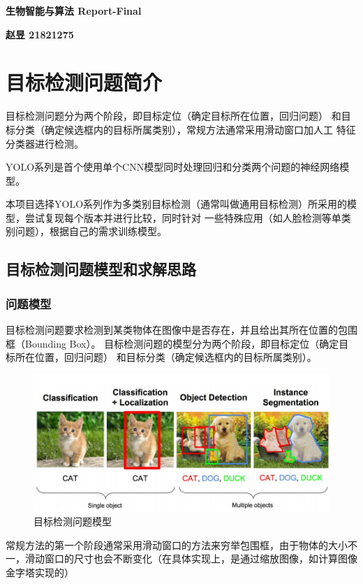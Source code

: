 \documentclass[a4paper, notitlepage]{article}
\begin{document}
\setlength{\parindent}{0pt}
\begin{center}
	\LARGE\textbf{生物智能与算法 Report-Final}
\end{center}
\vspace{1em}

\begin{center}
	\textbf{赵昱 21821275}
\end{center}

\setlength{\parindent}{2em}

\section{目标检测问题简介}
目标检测问题分为两个阶段，即目标定位（确定目标所在位置，回归问题）
和目标分类（确定候选框内的目标所属类别），常规方法通常采用滑动窗口加人工
特征分类器进行检测。

YOLO系列\cite{1,2,3}是首个使用单个CNN模型同时处理回归和分类两个问题的神经网络模型。

本项目选择YOLO系列作为多类别目标检测（通常叫做通用目标检测）所采用的模型，尝试复现每个版本并进行比较，同时针对
一些特殊应用（如人脸检测等单类别问题），根据自己的需求训练模型。

\subsection{目标检测问题模型和求解思路}
\subsubsection{问题模型}
目标检测问题要求检测到某类物体在图像中是否存在，并且给出其所在位置的包围框（Bounding Box）。
目标检测问题的模型分为两个阶段，即目标定位（确定目标所在位置，回归问题） 和目标分类（确定候选框内的目标所属类别）。
\begin{figure}[H]
    \centering
    \includegraphics[scale=0.4]{fig_problem_model}
    \caption{目标检测问题模型}
    \label{fig:example}
\end{figure}
常规方法的第一个阶段通常采用滑动窗口的方法来穷举包围框，由于物体的大小不一，滑动窗口的尺寸也会不断变化（在具体实现上，是通过缩放图像，如计算图像金字塔实现的）
\end{document}

